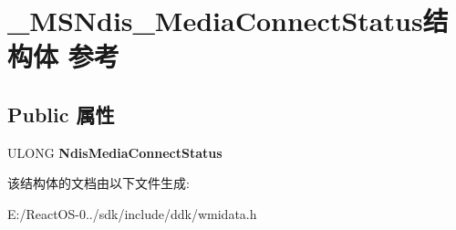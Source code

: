 \hypertarget{struct___m_s_ndis___media_connect_status}{}\section{\+\_\+\+M\+S\+Ndis\+\_\+\+Media\+Connect\+Status结构体 参考}
\label{struct___m_s_ndis___media_connect_status}
\subsection*{Public 属性}
\begin{DoxyCompactItemize}
\item 
\mbox{\label{struct___m_s_ndis___media_connect_status_ae00298e859c27586cab3f8c9754e5f26}} 
U\+L\+O\+NG {\bfseries Ndis\+Media\+Connect\+Status}
\end{DoxyCompactItemize}


该结构体的文档由以下文件生成\+:\begin{DoxyCompactItemize}
\item 
E\+:/\+React\+O\+S-\/0../sdk/include/ddk/wmidata.\+h\end{DoxyCompactItemize}
